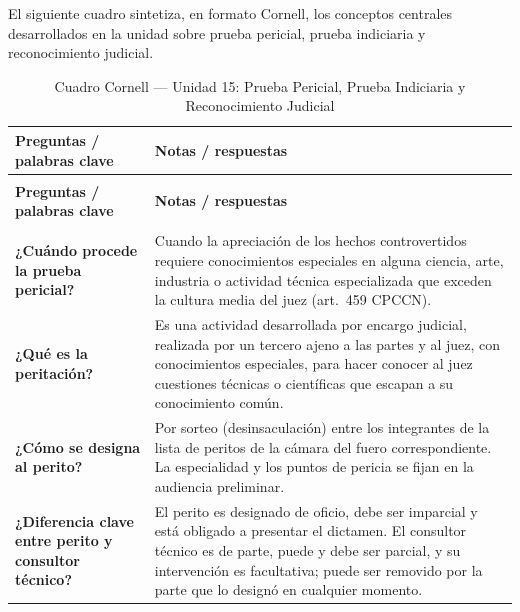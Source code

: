 \documentclass[12pt,oneside]{book}
\begin{document}
El siguiente cuadro sintetiza, en formato Cornell, los conceptos centrales desarrollados en la unidad sobre prueba pericial, prueba indiciaria y reconocimiento judicial.

\begin{longtable}{
    >{\raggedright\arraybackslash}p{}
    >{\raggedright\arraybackslash}p{}
}
\caption{Cuadro Cornell --- Unidad 15: Prueba Pericial, Prueba Indiciaria y Reconocimiento Judicial} \\
\toprule
\textbf{Preguntas / palabras clave} & \textbf{Notas / respuestas} \\
\midrule
\endfirsthead

\multicolumn{2}{c}{\textit{(continuación)}} \\
\toprule
\textbf{Preguntas / palabras clave} & \textbf{Notas / respuestas} \\
\midrule
\endhead

\midrule
\multicolumn{2}{r}{\textit{Continúa en la página siguiente}} \\
\endfoot

\bottomrule
\endlastfoot

\textbf{¿Cuándo procede la prueba pericial?} &
Cuando la apreciación de los hechos controvertidos requiere conocimientos especiales en alguna ciencia, arte, industria o actividad técnica especializada que exceden la cultura media del juez (art.\ 459 CPCCN). \\

\textbf{¿Qué es la peritación?} &
Es una actividad desarrollada por encargo judicial, realizada por un tercero ajeno a las partes y al juez, con conocimientos especiales, para hacer conocer al juez cuestiones técnicas o científicas que escapan a su conocimiento común. \\

\textbf{¿Cómo se designa al perito?} &
Por sorteo (desinsaculación) entre los integrantes de la lista de peritos de la cámara del fuero correspondiente. La especialidad y los puntos de pericia se fijan en la audiencia preliminar. \\

\textbf{¿Diferencia clave entre perito y consultor técnico?} &
El perito es designado de oficio, debe ser imparcial y está obligado a presentar el dictamen. El consultor técnico es de parte, puede y debe ser parcial, y su intervención es facultativa; puede ser removido por la parte que lo designó en cualquier momento. \\


\end{longtable}
\end{document}
